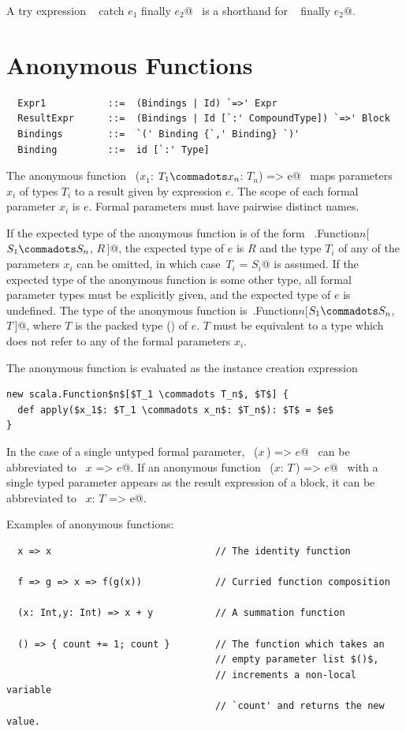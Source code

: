A try expression ~ catch $e_1$ finally $e_2$@~ 
is a shorthand
for  ~ finally $e_2$@.

\section{Anonymous Functions}
\label{sec:closures}

\syntax\begin{lstlisting}
  Expr1           ::=  (Bindings | Id) `=>' Expr
  ResultExpr      ::=  (Bindings | Id [`:' CompoundType]) `=>' Block
  Bindings        ::=  `(' Binding {`,' Binding} `)'
  Binding         ::=  id [`:' Type]
\end{lstlisting}

The anonymous function ~\lstinline@($x_1$: $T_1 \commadots x_n$: $T_n$) => e@~ 
maps parameters $x_i$ of types $T_i$ to a result given
by expression $e$. The scope of each formal parameter
$x_i$ is $e$. Formal parameters must have pairwise distinct names.

If the expected type of the anonymous function is of the form
~\lstinline@scala.Function$n$[$S_1 \commadots S_n$, $R\,$]@, the
expected type of $e$ is $R$ and the type $T_i$ of any of the
parameters $x_i$ can be omitted, in which
case~\lstinline@$T_i$ = $S_i$@ is assumed.
If the expected type of the anonymous function is
some other type, all formal parameter types must be explicitly given,
and the expected type of $e$ is undefined. The type of the anonymous
function
is~\lstinline@scala.Function$n$[$S_1 \commadots S_n$, $T\,$]@,
where $T$ is the packed type () 
of $e$. $T$ must be equivalent to a
type which does not refer to any of the formal parameters $x_i$.

The anonymous function is evaluated as the instance creation expression
\begin{lstlisting}
new scala.Function$n$[$T_1 \commadots T_n$, $T$] {
  def apply($x_1$: $T_1 \commadots x_n$: $T_n$): $T$ = $e$
}
\end{lstlisting}
In the case of a single untyped formal parameter, 
~\lstinline@($x\,$) => $e$@~ 
can be abbreviated to ~\lstinline@$x$ => $e$@. If an
anonymous function ~\lstinline@($x$: $T\,$) => $e$@~ with a single
typed parameter appears as the result expression of a block, it can be
abbreviated to ~\lstinline@$x$: $T$ => e@.

\example Examples of anonymous functions:

\begin{lstlisting}
  x => x                             // The identity function

  f => g => x => f(g(x))             // Curried function composition

  (x: Int,y: Int) => x + y           // A summation function

  () => { count += 1; count }        // The function which takes an
                                     // empty parameter list $()$, 
                                     // increments a non-local variable 
                                     // `count' and returns the new value.
\end{lstlisting}

